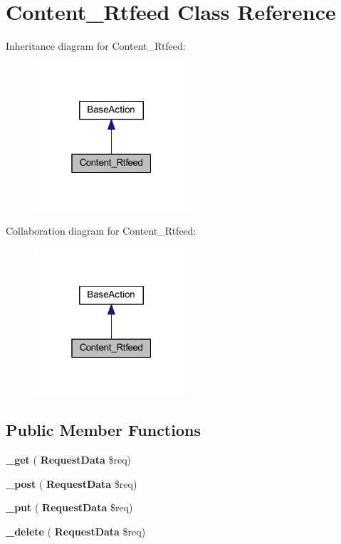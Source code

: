 \section{Content\+\_\+\+Rtfeed Class Reference}
\label{class_lora_1_1_content_1_1_content___rtfeed}


Inheritance diagram for Content\+\_\+\+Rtfeed\+:\nopagebreak
\begin{figure}[H]
\begin{center}
\leavevmode
\includegraphics[width=163pt]{class_lora_1_1_content_1_1_content___rtfeed__inherit__graph}
\end{center}
\end{figure}


Collaboration diagram for Content\+\_\+\+Rtfeed\+:\nopagebreak
\begin{figure}[H]
\begin{center}
\leavevmode
\includegraphics[width=163pt]{class_lora_1_1_content_1_1_content___rtfeed__coll__graph}
\end{center}
\end{figure}
\subsection*{Public Member Functions}
\begin{DoxyCompactItemize}
\item 
\mbox{\label{class_lora_1_1_content_1_1_content___rtfeed_a3ad4bf1b146a3180b34d1327ff2abf69}} 
{\bfseries \+\_\+get} (\textbf{ Request\+Data} \$req)
\item 
\mbox{\label{class_lora_1_1_content_1_1_content___rtfeed_a50751d47a139282d1c3b08cab1b6562e}} 
{\bfseries \+\_\+post} (\textbf{ Request\+Data} \$req)
\item 
\mbox{\label{class_lora_1_1_content_1_1_content___rtfeed_a2affcc8f31c13147c33450193b229194}} 
{\bfseries \+\_\+put} (\textbf{ Request\+Data} \$req)
\item 
\mbox{\label{class_lora_1_1_content_1_1_content___rtfeed_ab8ddc6de1e04524212f7d55893f78864}} 
{\bfseries \+\_\+delete} (\textbf{ Request\+Data} \$req)
\end{DoxyCompactItemize}
